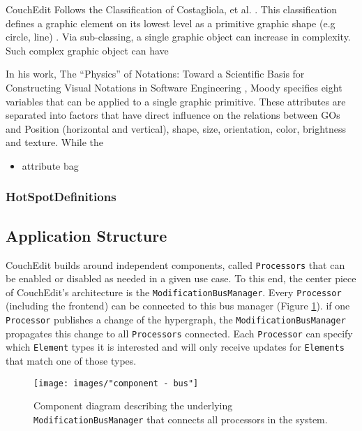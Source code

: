 CouchEdit Follows the Classification of Costagliola, et al. \cite{costagliola_classification_2002}. This classification defines a graphic element on its lowest level as a primitive graphic shape (e.g circle, line) . Via sub-classing, a single graphic object can increase in complexity. Such complex graphic object can have  


In his work, The “Physics” of Notations: Toward a Scientific Basis for Constructing Visual Notations in Software Engineering \cite{moody_physics_2009}, Moody specifies eight variables that can be applied to a single graphic primitive. These attributes are separated into factors that have direct influence on the relations between GOs and   Position
(horizontal and vertical), shape, size, orientation, color, brightness and texture. While the 



\begin{itemize}
  \item attribute bag
\end{itemize}

\subsubsection{HotSpotDefinitions}


\subsection{Application Structure}
CouchEdit builds around independent components, called \texttt{Processors} that can be enabled or disabled as needed in a given use case. To this end, the center piece of CouchEdit's architecture is the \texttt{ModificationBusManager}. Every \texttt{Processor} (including the frontend) can be connected to this bus manager (Figure \ref{fig:bus}). if one \texttt{Processor} publishes a change of the hypergraph, the \texttt{ModificationBusManager} propagates this change to all \texttt{Processors} connected. Each \texttt{Processor} can specify which \texttt{Element} types it is interested and will only receive updates for \texttt{Elements} that match one of those types. 

\begin{figure}
\centering
\texttt{[image: images/"component - bus"]}
\caption{Component diagram describing the underlying \texttt{ModificationBusManager} that connects all processors in the system.}
\label{fig:bus}
\end{figure}


